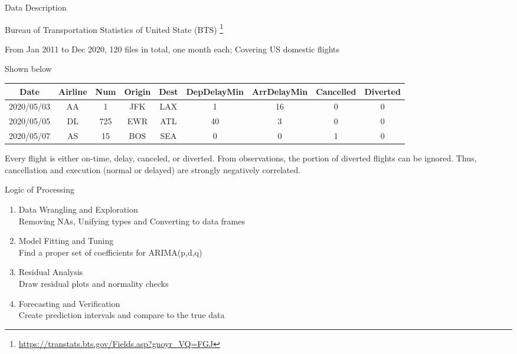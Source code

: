 \documentclass[11pt]{beamer}
\begin{document}
\begin{frame}{Data Description}
\begin{description}
  \item[Source] Bureau of Transportation Statistics of United State (BTS)
  \footnote{\url{https://transtats.bts.gov/Fields.asp?gnoyr_VQ=FGJ}}
  \item[Scope] From Jan 2011 to Dec 2020,  120 files in total, one month each; Covering US domestic flights
  \item[Snippet] Shown below
\end{description}
\begin{table}[h!] 
\tiny
\centering
 \begin{tabular}{|c|c|c|c|c|c|c|c|c|}
  \hline 
 Date & Airline & Num & Origin & Dest & DepDelayMin & ArrDelayMin & Cancelled & Diverted\\ 
  \hline 
  2020/05/03 & AA & 1 & JFK & LAX & 1 & 16 & 0 & 0 \\ 
  2020/05/05 & DL & 725 & EWR & ATL & 40 & 3 & 0 & 0 \\ 
  2020/05/07 & AS & 15 & BOS & SEA & 0 & 0 & 1 & 0 \\ 
   \hline
 \end{tabular} 
 \end{table}
 \small
 Every flight is either on-time, delay, canceled, or diverted.  From observations, the portion of diverted flights can be ignored. Thus,  cancellation and execution (normal or delayed) are strongly negatively correlated.
\end{frame}

\begin{frame}{Logic of Processing}
\begin{enumerate}
\large
\item Data Wrangling and Exploration \\
{\small Removing NAs,  Unifying types and Converting to data frames}
\item Model Fitting and Tuning \\
{\small Find a proper set of coefficients for ARIMA(p,d,q)}
\item Residual Analysis \\
{\small Draw residual plots and normality checks}
\item Forecasting and Verification \\
{\small Create prediction intervals and compare to the true data}
\end{enumerate}
\end{frame}
 
\end{document}
